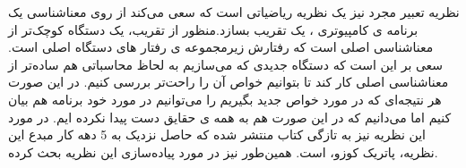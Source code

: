 نظریه تعبیر مجرد\cite{cousot1} نیز یک نظریه ریاضیاتی است که سعی می‌کند از روی معناشناسی یک برنامه ی کامپیوتری\cite{winskel} ، یک تقریب بسازد.منظور از تقریب، یک دستگاه کوچک‌تر از معناشناسی اصلی است که رفتارش زیرمجموعه ی رفتار های دستگاه اصلی است. سعی بر این است که دستگاه جدیدی که می‌سازیم به لحاظ محاسباتی هم ساده‌تر از معناشناسی اصلی کار کند تا بتوانیم خواص آن را راحت‌تر بررسی کنیم. در این صورت هر نتیجه‌ای که در مورد خواص جدید بگیریم را می‌توانیم در مورد خود برنامه هم بیان کنیم اما می‌دانیم که در این صورت هم به همه ی حقایق دست پیدا نکرده ایم. در مورد این نظریه نیز به تازگی کتاب\cite{cousotbook} منتشر شده که حاصل نزدیک به 5 دهه کار مبدع این نظریه، پاتریک کوزو، است. همین‌طور\cite{statica} نیز در مورد پیاده‌سازی این نظریه بحث کرده.
